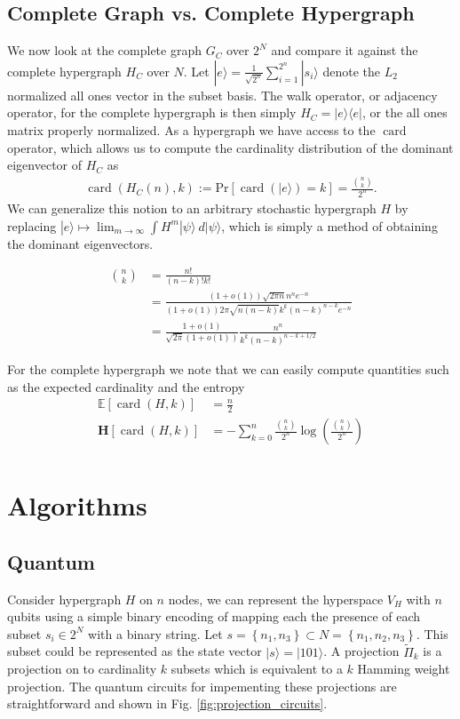 \documentclass{article}
\newcommand{\ket}[1]{|#1\rangle}
\newcommand{\ketbra}[2]{| #1\rangle\! \langle #2|}
\newcommand{\parens}[1]{\left( #1 \right)}
\newcommand{\brackets}[1]{\left[ #1 \right]}
\newcommand{\set}[1]{\left\{ #1 \right\}}
\newcommand{\expect}[1]{\mathbb{E}\brackets{#1}}
\newcommand{\prob}[1]{\text{Pr}\left[ #1 \right]}
\DeclareMathOperator{\card}{card}
\newcommand{\cardi}[1]{\card \parens{ #1 }}
\newcommand{\fullProj}{\widetilde{\Pi}}
\begin{document}
\subsection{Complete Graph vs. Complete Hypergraph}
We now look at the complete graph $G_C$ over $2^N$ and compare it against the complete hypergraph $H_C$ over $N$. Let $\ket{e} = \frac{1}{\sqrt{2^n}} \sum_{i=1}^{2^n} \ket{s_i}$ denote the $L_2$ normalized all ones vector in the subset basis. The walk operator, or adjacency operator, for the complete hypergraph is then simply $H_C = \ketbra{e}{e}$, or the all ones matrix properly normalized. As a hypergraph we have access to the $\card$ operator, which allows us to compute the cardinality distribution of the dominant eigenvector of $H_C$ as
\begin{align}
    \cardi{H_C(n), k} := \prob{\cardi{\ket{e}} = k } = \frac{\binom{n}{k}}{2^n}.
\end{align}
We can generalize this notion to an arbitrary stochastic hypergraph $H$  by replacing $\ket{e} \mapsto \lim_{m \to \infty} \int H^m \ket{\psi} ~d\ket{\psi} $, which is simply a method of obtaining the dominant eigenvectors.


\begin{align}
    \binom{n}{k} &= \frac{n!}{(n-k)! k!} \\
    &= \frac{(1 + o(1))\sqrt{2 \pi n} n^n e^{-n}}{(1+o(1)) 2 \pi \sqrt{n (n-k)} k^k (n-k)^{n-k} e^{-n}} \\
    &= \frac{1 + o(1)}{\sqrt{2 \pi}(1+o(1))} \frac{n^n}{ k^k (n-k)^{n-k + 1/2}}
\end{align}

For the complete hypergraph we note that we can easily compute quantities such as the expected cardinality and the entropy
\begin{align}
    \expect{\cardi{H, k}} &= \frac{n}{2} \\
    \mathbf{H} \brackets{\cardi{H, k}} &= - \sum_{k=0}^{n} \frac{\binom{n}{k}}{2^n} \log \parens{\frac{\binom{n}{k}}{2^n}}\\
\end{align}

\section{Algorithms} \label{sec:algorithms}
\subsection{Quantum}
Consider hypergraph $H$ on $n$ nodes, we can represent the hyperspace $V_H$ with $n$ qubits using a simple binary encoding of mapping each the presence of each subset $s_i \in 2^N$ with a binary string. Let $s = \set{n_1, n_3} \subset N = \set{n_1, n_2, n_3} $. This subset could be represented as the state vector $\ket{s} = \ket{101}$. A projection $\fullProj_k$ is a projection on to cardinality $k$ subsets which is equivalent to a $k$ Hamming weight projection. The quantum circuits for impementing these projections are straightforward and shown in Fig. \ref{fig:projection_circuits}.
\end{document}
